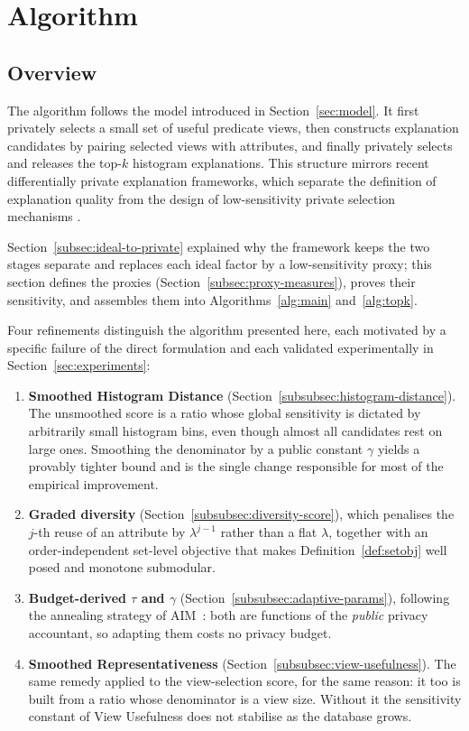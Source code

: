 
\section{Algorithm}\label{sec:solution}

\subsection{Overview}
\label{subsec:algorithm-overview}

The algorithm follows the model introduced in Section~\ref{sec:model}.
It first privately selects a small set of useful predicate views, then constructs explanation candidates by pairing selected views with attributes, and finally privately selects and releases the top-$k$ histogram explanations.
This structure mirrors recent differentially private explanation frameworks, which separate the definition of explanation quality from the design of low-sensitivity private selection mechanisms \cite{TaoGMR22}.

Section~\ref{subsec:ideal-to-private} explained why the framework keeps the two stages separate and replaces each ideal factor by a low-sensitivity proxy; this section defines the proxies (Section~\ref{subsec:proxy-measures}), proves their sensitivity, and assembles them into Algorithms~\ref{alg:main} and~\ref{alg:topk}.

Four refinements distinguish the algorithm presented here, each motivated by a specific failure of the direct formulation and each validated experimentally in Section~\ref{sec:experiments}:
\begin{enumerate}
  \item \textbf{Smoothed Histogram Distance} (Section~\ref{subsubsec:histogram-distance}). The unsmoothed score is a ratio whose global sensitivity is dictated by arbitrarily small histogram bins, even though almost all candidates rest on large ones. Smoothing the denominator by a public constant $\gamma$ yields a provably tighter bound and is the single change responsible for most of the empirical improvement.
  \item \textbf{Graded diversity} (Section~\ref{subsubsec:diversity-score}), which penalises the $j$-th reuse of an attribute by $\lambda^{j-1}$ rather than a flat $\lambda$, together with an order-independent set-level objective that makes Definition~\ref{def:setobj} well posed and monotone submodular.
  \item \textbf{Budget-derived $\tau$ and $\gamma$} (Section~\ref{subsubsec:adaptive-params}), following the annealing strategy of AIM~\cite{McKennaMSM22}: both are functions of the \emph{public} privacy accountant, so adapting them costs no privacy budget.
  \item \textbf{Smoothed Representativeness} (Section~\ref{subsubsec:view-usefulness}). The same remedy applied to the view-selection score, for the same reason: it too is built from a ratio whose denominator is a view size. Without it the sensitivity constant of View Usefulness does not stabilise as the database grows.
\end{enumerate}

